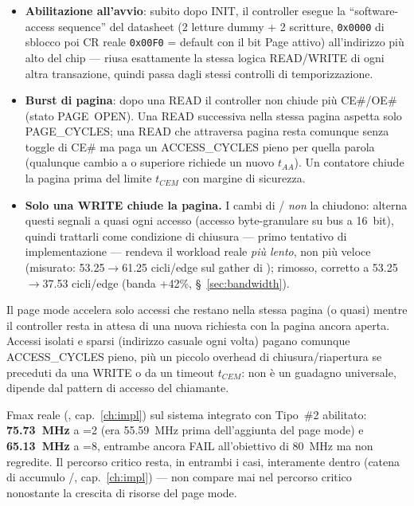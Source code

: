 \begin{itemize}
\item \textbf{Abilitazione all'avvio}: subito dopo INIT, il controller esegue la
  ``software-access sequence'' del datasheet (2 letture dummy + 2 scritture,
  \texttt{0x0000} di sblocco poi CR reale \texttt{0x00F0} = default con il bit
  Page attivo) all'indirizzo più alto del chip --- riusa esattamente la stessa
  logica READ/WRITE di ogni altra transazione, quindi passa dagli stessi controlli
  di temporizzazione.
\item \textbf{Burst di pagina}: dopo una READ il controller non chiude più
  CE\#/OE\# (stato PAGE~OPEN). Una READ successiva nella stessa pagina aspetta solo
  PAGE\_CYCLES; una READ che attraversa pagina resta comunque senza toggle di CE\#
  ma paga un ACCESS\_CYCLES pieno per quella parola (qualunque cambio a
   o superiore richiede un nuovo $t_{AA}$). Un contatore chiude la
  pagina prima del limite $t_{CEM}$ con margine di sicurezza.
\item \textbf{Solo una WRITE chiude la pagina.} I cambi di /
  \emph{non} la chiudono:  alterna questi segnali a quasi
  ogni accesso (accesso byte-granulare su bus a 16~bit), quindi trattarli come
  condizione di chiusura --- primo tentativo di implementazione --- rendeva il
  workload reale \emph{più lento}, non più veloce (misurato: 53.25$\to$61.25
  cicli/edge sul gather di ); rimosso, corretto a
  53.25$\to$37.53 cicli/edge (banda +42\%, \S~\ref{sec:bandwidth}).
\end{itemize}

\begin{fnwarn}
Il page mode accelera solo accessi che restano nella stessa pagina (o quasi) mentre
il controller resta in attesa di una nuova richiesta con la pagina ancora aperta.
Accessi isolati e sparsi (indirizzo casuale ogni volta) pagano comunque
ACCESS\_CYCLES pieno, più un piccolo overhead di chiusura/riapertura se preceduti
da una WRITE o da un timeout $t_{CEM}$: non è un guadagno universale, dipende dal
pattern di accesso del chiamante.
\end{fnwarn}

Fmax reale (, cap.~\ref{ch:impl}) sul sistema integrato
 con Tipo~\#2 abilitato: \textbf{75.73~MHz} a
=2 (era 55.59~MHz prima dell'aggiunta del page mode) e
\textbf{65.13~MHz} a =8, entrambe ancora FAIL all'obiettivo di
80~MHz ma non regredite. Il percorso critico resta, in entrambi i casi,
interamente dentro  (catena di accumulo
/, cap.~\ref{ch:impl}) --- 
non compare mai nel percorso critico nonostante la crescita di risorse del page
mode.

